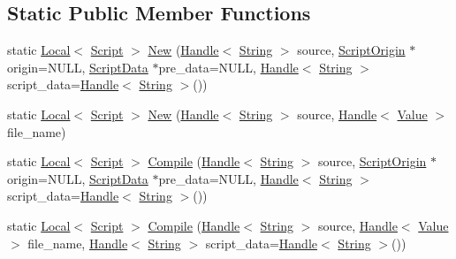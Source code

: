 \subsection*{Static Public Member Functions}
\begin{DoxyCompactItemize}
\item 
static \hyperlink{classv8_1_1_local}{Local}$<$ \hyperlink{classv8_1_1_script}{Script} $>$ \hyperlink{classv8_1_1_script_a9f36775d3dfa63a02d265bb265e94638}{New} (\hyperlink{classv8_1_1_handle}{Handle}$<$ \hyperlink{classv8_1_1_string}{String} $>$ source, \hyperlink{classv8_1_1_script_origin}{Script\+Origin} $\ast$origin=N\+U\+L\+L, \hyperlink{classv8_1_1_script_data}{Script\+Data} $\ast$pre\+\_\+data=N\+U\+L\+L, \hyperlink{classv8_1_1_handle}{Handle}$<$ \hyperlink{classv8_1_1_string}{String} $>$ script\+\_\+data=\hyperlink{classv8_1_1_handle}{Handle}$<$ \hyperlink{classv8_1_1_string}{String} $>$())
\item 
static \hyperlink{classv8_1_1_local}{Local}$<$ \hyperlink{classv8_1_1_script}{Script} $>$ \hyperlink{classv8_1_1_script_aebbe434ea4df560ffc8eb290f7ac284b}{New} (\hyperlink{classv8_1_1_handle}{Handle}$<$ \hyperlink{classv8_1_1_string}{String} $>$ source, \hyperlink{classv8_1_1_handle}{Handle}$<$ \hyperlink{classv8_1_1_value}{Value} $>$ file\+\_\+name)
\item 
static \hyperlink{classv8_1_1_local}{Local}$<$ \hyperlink{classv8_1_1_script}{Script} $>$ \hyperlink{classv8_1_1_script_a55964f8e427dfa4d0fef33a9998cebc3}{Compile} (\hyperlink{classv8_1_1_handle}{Handle}$<$ \hyperlink{classv8_1_1_string}{String} $>$ source, \hyperlink{classv8_1_1_script_origin}{Script\+Origin} $\ast$origin=N\+U\+L\+L, \hyperlink{classv8_1_1_script_data}{Script\+Data} $\ast$pre\+\_\+data=N\+U\+L\+L, \hyperlink{classv8_1_1_handle}{Handle}$<$ \hyperlink{classv8_1_1_string}{String} $>$ script\+\_\+data=\hyperlink{classv8_1_1_handle}{Handle}$<$ \hyperlink{classv8_1_1_string}{String} $>$())
\item 
static \hyperlink{classv8_1_1_local}{Local}$<$ \hyperlink{classv8_1_1_script}{Script} $>$ \hyperlink{classv8_1_1_script_ab867221dfb123d88059a88a6b69added}{Compile} (\hyperlink{classv8_1_1_handle}{Handle}$<$ \hyperlink{classv8_1_1_string}{String} $>$ source, \hyperlink{classv8_1_1_handle}{Handle}$<$ \hyperlink{classv8_1_1_value}{Value} $>$ file\+\_\+name, \hyperlink{classv8_1_1_handle}{Handle}$<$ \hyperlink{classv8_1_1_string}{String} $>$ script\+\_\+data=\hyperlink{classv8_1_1_handle}{Handle}$<$ \hyperlink{classv8_1_1_string}{String} $>$())
\end{DoxyCompactItemize}


